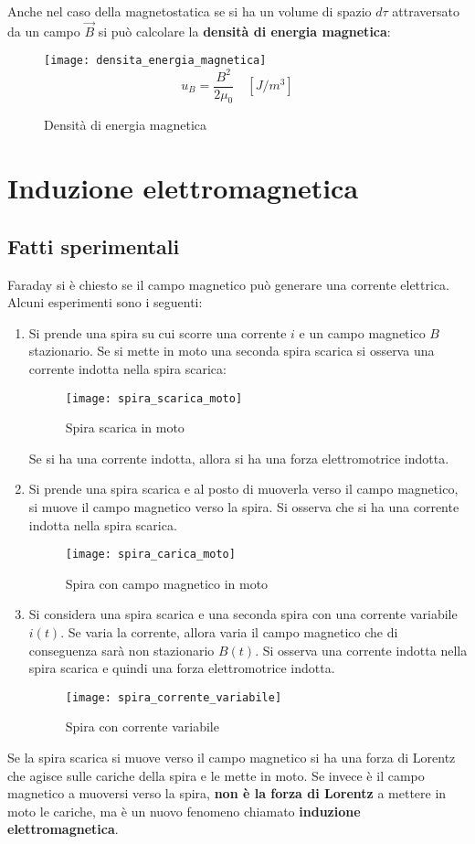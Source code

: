 \documentclass[a4paper]{article}
\begin{document}
\vspace{1em}
\noindent
Anche nel caso della magnetostatica se si ha un volume di spazio \( d \tau \)
attraversato da un campo \( \vec{B} \) si può calcolare la \textbf{densità di energia magnetica}:
\begin{figure}[H]
  \centering
  \texttt{[image: densita\_energia\_magnetica]}
  \[
    u_B = \frac{B^2}{2 \mu_0} \quad \left[ J/m^3 \right]
  \] 
  \caption{Densità di energia magnetica}
\end{figure}

\section{Induzione elettromagnetica}
\subsection{Fatti sperimentali}
Faraday si è chiesto se il campo magnetico può generare una corrente elettrica. 
Alcuni esperimenti sono i seguenti:
\begin{enumerate}
  \item Si prende una spira su cui scorre una corrente \( i \) e un campo magnetico \( B \)
    stazionario. Se si mette in moto una seconda spira scarica si osserva una corrente
    indotta nella spira scarica:
    \begin{figure}[H]
      \centering
      \texttt{[image: spira\_scarica\_moto]}
      \caption{Spira scarica in moto}
    \end{figure}
    \noindent
    Se si ha una corrente indotta, allora si ha una forza elettromotrice indotta.

  \item Si prende una spira scarica e al posto di muoverla verso il campo magnetico,
    si muove il campo magnetico verso la spira. Si osserva che si ha una corrente indotta
    nella spira scarica.
    \begin{figure}[H]
      \centering
      \texttt{[image: spira\_carica\_moto]}
      \caption{Spira con campo magnetico in moto}
    \end{figure}

  \item Si considera una spira scarica e una seconda spira con una corrente variabile
    \( i(t) \). Se varia la corrente, allora varia il campo magnetico che di conseguenza
    sarà non stazionario \( B(t) \). Si osserva una corrente indotta nella spira
    scarica e quindi una forza elettromotrice indotta.
    \begin{figure}[H]
      \centering
      \texttt{[image: spira\_corrente\_variabile]}
      \caption{Spira con corrente variabile}
    \end{figure}
\end{enumerate}
Se la spira scarica si muove verso il campo magnetico si ha una forza di Lorentz che agisce
sulle cariche della spira e le mette in moto. Se invece è il campo magnetico a muoversi
verso la spira, \textbf{non è la forza di Lorentz} a mettere in moto le cariche, ma è un
nuovo fenomeno chiamato \textbf{induzione elettromagnetica}.
\end{document}
